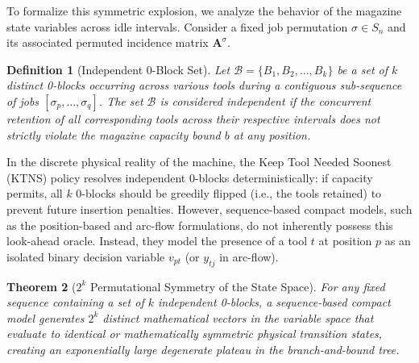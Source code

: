 \documentclass[11pt, a4paper]{book}
\newtheorem{theorem}{Theorem}[chapter]
\newtheorem{definition}[theorem]{Definition}
\begin{document}
	To formalize this symmetric explosion, we analyze the behavior of the magazine state variables across idle intervals. Consider a fixed job permutation $\sigma \in S_n$ and its associated permuted incidence matrix $\mathbf{A}^\sigma$.
	
	\begin{definition}[Independent 0-Block Set]
		Let $\mathcal{B} = \{B_1, B_2, \dots, B_k\}$ be a set of $k$ distinct 0-blocks occurring across various tools during a contiguous sub-sequence of jobs $[\sigma_p, \dots, \sigma_q]$. The set $\mathcal{B}$ is considered independent if the concurrent retention of all corresponding tools across their respective intervals does not strictly violate the magazine capacity bound $b$ at any position.
	\end{definition}
	
	In the discrete physical reality of the machine, the Keep Tool Needed Soonest (KTNS) policy resolves independent 0-blocks deterministically: if capacity permits, all $k$ 0-blocks should be greedily flipped (i.e., the tools retained) to prevent future insertion penalties. However, sequence-based compact models, such as the position-based and arc-flow formulations, do not inherently possess this look-ahead oracle. Instead, they model the presence of a tool $t$ at position $p$ as an isolated binary decision variable $v_{pt}$ (or $y_{tj}$ in arc-flow).
	
	\begin{theorem}[$2^k$ Permutational Symmetry of the State Space]
		For any fixed sequence containing a set of $k$ independent 0-blocks, a sequence-based compact model generates $2^k$ distinct mathematical vectors in the variable space that evaluate to identical or mathematically symmetric physical transition states, creating an exponentially large degenerate plateau in the branch-and-bound tree.
	\end{theorem}
	
\end{document}
